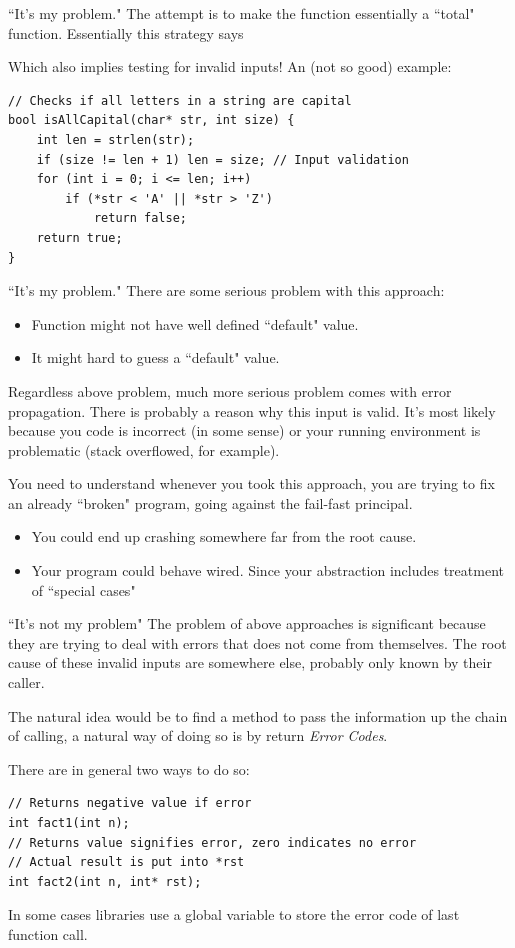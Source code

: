 \begin{frame}[fragile]{``It's my problem."}
The attempt is to make the function essentially a ``total" function. Essentially this strategy says 
\begin{center}
\end{center}
Which also implies testing for invalid inputs! An (not so good) example:
\begin{verbatim}
// Checks if all letters in a string are capital
bool isAllCapital(char* str, int size) {
    int len = strlen(str);
    if (size != len + 1) len = size; // Input validation
    for (int i = 0; i <= len; i++) 
        if (*str < 'A' || *str > 'Z')
            return false;
    return true;
}
\end{verbatim}
\end{frame}

\begin{frame}{``It's my problem."}
There are some serious problem with this approach:
\begin{itemize}
	\item Function might not have well defined ``default" value. 
	\item It might hard to guess a ``default" value. 
\end{itemize}
Regardless above problem, much more serious problem comes with error propagation. There is probably a reason why this input is valid. It's most likely because you code is incorrect (in some sense) or your running environment is problematic (stack overflowed, for example).

You need to understand whenever you took this approach, you are trying to fix an already ``broken" program, going against the fail-fast principal.

\begin{itemize}
	\item You could end up crashing somewhere far from the root cause.
	\item Your program could behave wired. Since your abstraction includes treatment of ``special cases"
\end{itemize}
\end{frame}

\begin{frame}[fragile]{``It's not my problem"}
The problem of above approaches is significant because they are trying to deal with errors that does not come from themselves. The root cause of these invalid inputs are somewhere else, probably only known by their caller. 

The natural idea would be to find a method to pass the information up the chain of calling, a natural way of doing so is by return \textit{Error Codes}.

There are in general two ways to do so:
\begin{verbatim}
// Returns negative value if error
int fact1(int n);
// Returns value signifies error, zero indicates no error
// Actual result is put into *rst 
int fact2(int n, int* rst);
\end{verbatim}
In some cases libraries use a global variable to store the error code of last function call.
\end{frame}

